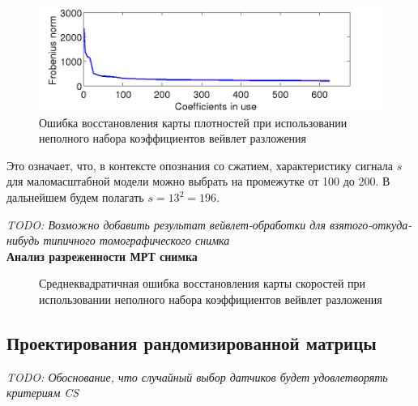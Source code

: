 \documentclass[14pt]{matmex-diploma}
\begin{document}
\begin{figure}[h]
\centering
    \includegraphics[width=1\textwidth]{pics/used_coeff.png}
	\caption{Ошибка восстановления карты плотностей при использовании неполного набора коэффициентов вейвлет разложения}
	\label{fig:used_coeff}
\end{figure}

Это означает, что, в контексте опознания со сжатием, характеристику сигнала $s$ для маломасштабной модели можно выбрать на промежутке от 100 до 200. В дальнейшем будем полагать $s=13^2 = 196 $.


\textit{TODO: Возможно добавить результат вейвлет-обработки для взятого-откуда-нибудь типичного томографического снимка} \\
\textbf{Анализ разреженности МРТ снимка}
\begin{figure}[h]
    \caption{Среднеквадратичная ошибка восстановления карты скоростей при использовании неполного набора коэффициентов вейвлет разложения}
    \centering
    \label{lbfgsvssgd}
\end{figure}


\subsection{Проектирования рандомизированной матрицы}
\textit{TODO: Обоснование, что случайный выбор датчиков будет удовлетворять критериям CS}\\
\end{document}
